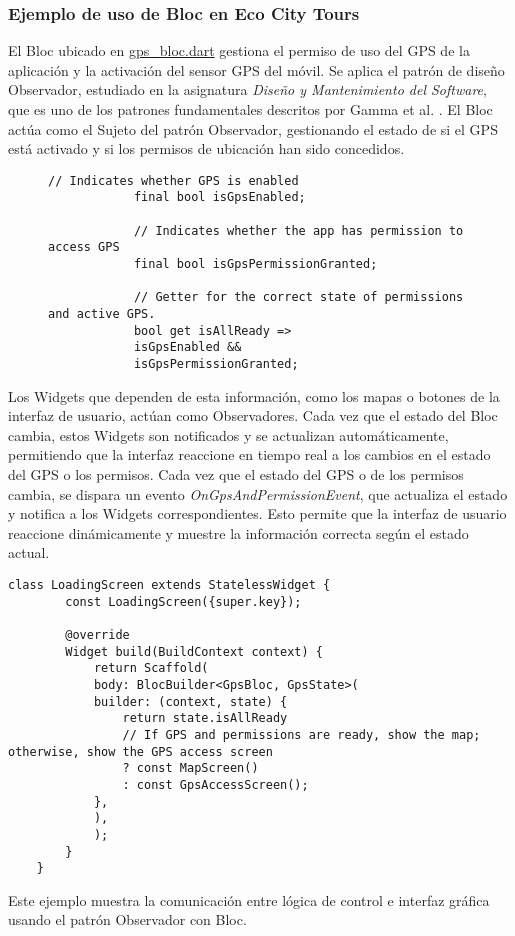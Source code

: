 	\subsubsection{Ejemplo de uso de Bloc en Eco City Tours}
	El Bloc ubicado en \href{https://github.com/fps1001/TFGII_FPisot/tree/main/project-app/project_app/lib/blocs/gps/gps_bloc.dart}{gps\_bloc.dart} gestiona el permiso de uso del GPS de la aplicación y la activación del sensor GPS del móvil. 
	Se aplica el patrón de diseño Observador, estudiado en la asignatura \textit{Diseño y Mantenimiento del Software}, que es uno de los patrones fundamentales descritos por Gamma et al. \cite{gamma2002}.
	El Bloc actúa como el Sujeto del patrón Observador, gestionando el estado de si el GPS está activado y si los permisos de ubicación han sido concedidos.
	
	\begin{figure}[htbp] %
		\centering
		\begin{lstlisting}[caption={Definición de variables de control en el Bloc}]
			// Indicates whether GPS is enabled
			final bool isGpsEnabled;
			
			// Indicates whether the app has permission to access GPS
			final bool isGpsPermissionGranted;
			
			// Getter for the correct state of permissions and active GPS.
			bool get isAllReady =>
			isGpsEnabled &&
			isGpsPermissionGranted;
		\end{lstlisting}
	\end{figure}
	Los Widgets que dependen de esta información, como los mapas o botones de la interfaz de usuario, actúan como Observadores. Cada vez que el estado del Bloc cambia, estos Widgets son notificados y se actualizan automáticamente, permitiendo que la interfaz reaccione en tiempo real a los cambios en el estado del GPS o los permisos.
	Cada vez que el estado del GPS o de los permisos cambia, se dispara un evento \textit{OnGpsAndPermissionEvent}, que actualiza el estado y notifica a los Widgets correspondientes. Esto permite que la interfaz de usuario reaccione dinámicamente y muestre la información correcta según el estado actual.
	
	\begin{lstlisting}[caption={Carga en función del estado}]
	class LoadingScreen extends StatelessWidget {
		const LoadingScreen({super.key});
		
		@override
		Widget build(BuildContext context) {
			return Scaffold(
			body: BlocBuilder<GpsBloc, GpsState>(
			builder: (context, state) {
				return state.isAllReady 
				// If GPS and permissions are ready, show the map; otherwise, show the GPS access screen
				? const MapScreen()
				: const GpsAccessScreen();
			},
			),
			);
		}
	}
	\end{lstlisting}	
	Este ejemplo muestra la comunicación entre lógica de control e interfaz gráfica usando el patrón Observador con Bloc.
	
